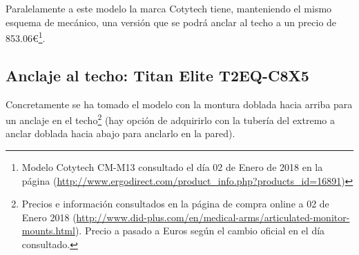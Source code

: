  Paralelamente a este modelo la marca Cotytech tiene, manteniendo el mismo esquema de mecánico, una versión que se podrá anclar al techo a un precio de 853.06\euro \footnote{Modelo Cotytech CM-M13 consultado el día 02 de Enero de 2018 en la página (\url{http://www.ergodirect.com/product_info.php?products_id=16891})}.
 \\ 
 
 
\subsection{Anclaje al techo: Titan Elite T2EQ-C8X5} 
 
 Concretamente se ha tomado el modelo con la montura doblada hacia arriba para un anclaje en el techo\footnote{Precios e información consultados en la página de compra online a 02 de Enero 2018 (\url{http://www.did-plus.com/en/medical-arms/articulated-monitor-mounts.html}). Precio a pasado a Euros según el cambio oficial en el día consultado.} (hay opción de adquirirlo con la tubería del extremo a anclar doblada hacia abajo para anclarlo en la pared).
 
